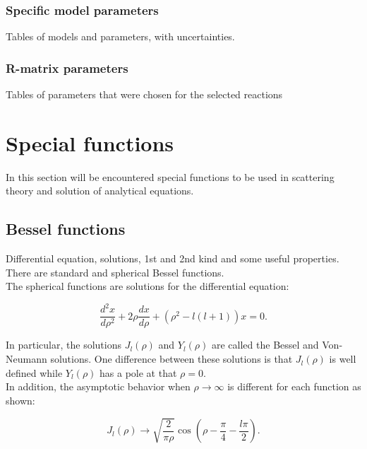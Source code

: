 \documentclass[openany]{book}
\begin{document}
\subsection{Specific model parameters} \label{sub:modelParameters}

Tables of models and parameters, with uncertainties. 

\subsection{R-matrix parameters} \label{sub:rmatrixParameters}

Tables of parameters that were chosen for the selected reactions

\chapter{Special functions} \label{ap:specialFunctions}

In this section will be encountered special functions to be used in scattering theory and solution of analytical equations.

\section{Bessel functions} \label{sec:bessel}

Differential equation, solutions, 1st and 2nd kind and some useful properties. There are standard and spherical Bessel functions. \\

The spherical functions are solutions for the differential equation:

\begin{equation} \label{eq:special_bessel_diffEquation}
	\frac{d^2x}{d\rho^2} + 2\rho \frac{dx}{d\rho} + (\rho^2 - l(l+1))x= 0.
\end{equation}

In particular, the solutions $J_l(\rho)$ and $Y_l(\rho)$ are called the Bessel and Von-Neumann solutions. One difference between these solutions is that $J_l(\rho)$ is well defined while $Y_l(\rho)$  has a pole at that $\rho = 0$.   \\

In addition, the asymptotic behavior when $\rho \rightarrow \infty$ is different for each function as shown:

\begin{equation} \label{eq:special_bessel_J}
	J_l(\rho) \rightarrow \sqrt{ \frac{2}{\pi\rho}}\cos{\left(\rho - \frac{\pi}{4} - \frac{l\pi}{2}\right)}.
\end{equation}
\end{document}
